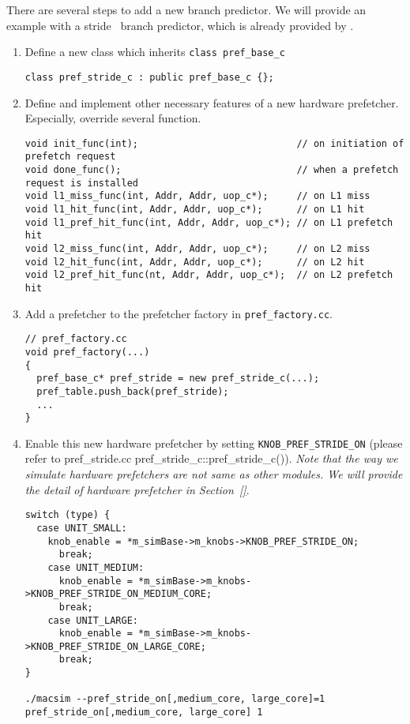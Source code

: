 There are several steps to add a new branch predictor. We will provide
an example with a stride~\cite{iac:spr04} branch predictor, which is already
provided by \SIM.

\begin{enumerate}[Step 1.]
  \item Define a new class which inherits \Verb+class pref_base_c+
\begin{Verbatim}
class pref_stride_c : public pref_base_c {};
\end{Verbatim}

  \item Define and implement other necessary features of a new
    hardware prefetcher. Especially, override several function.
\begin{Verbatim}
void init_func(int);                            // on initiation of prefetch request
void done_func();                               // when a prefetch request is installed
void l1_miss_func(int, Addr, Addr, uop_c*);     // on L1 miss
void l1_hit_func(int, Addr, Addr, uop_c*);      // on L1 hit
void l1_pref_hit_func(int, Addr, Addr, uop_c*); // on L1 prefetch hit
void l2_miss_func(int, Addr, Addr, uop_c*);     // on L2 miss
void l2_hit_func(int, Addr, Addr, uop_c*);      // on L2 hit
void l2_pref_hit_func(nt, Addr, Addr, uop_c*);  // on L2 prefetch hit
\end{Verbatim}

  \item Add a prefetcher to the prefetcher factory in \Verb+pref_factory.cc+.

\begin{Verbatim}
// pref_factory.cc
void pref_factory(...)
{
  pref_base_c* pref_stride = new pref_stride_c(...);
  pref_table.push_back(pref_stride);
  ...
}
\end{Verbatim}

  \item Enable this new hardware prefetcher by setting
    \Verb+KNOB_PREF_STRIDE_ON+ (please refer to pref\_stride.cc
    pref\_stride\_c::pref\_stride\_c()). \textit{Note that the way we
      simulate hardware prefetchers are not same as other modules. We
      will provide the detail of hardware prefetcher in
      Section~\ref{}}.
\begin{Verbatim}
switch (type) {
  case UNIT_SMALL:
    knob_enable = *m_simBase->m_knobs->KNOB_PREF_STRIDE_ON;
      break;
    case UNIT_MEDIUM:
      knob_enable = *m_simBase->m_knobs->KNOB_PREF_STRIDE_ON_MEDIUM_CORE;
      break;
    case UNIT_LARGE:
      knob_enable = *m_simBase->m_knobs->KNOB_PREF_STRIDE_ON_LARGE_CORE;
      break;
}

./macsim --pref_stride_on[,medium_core, large_core]=1
pref_stride_on[,medium_core, large_core] 1
\end{Verbatim}
\end{enumerate}

